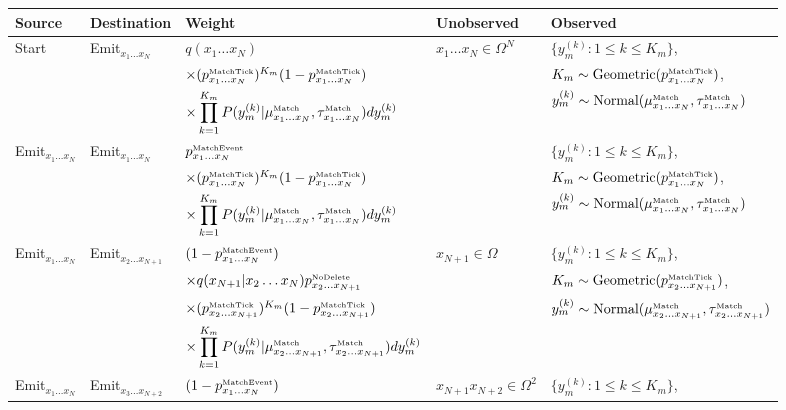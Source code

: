 \documentclass[10pt]{article}
\begin{document}
\noindent
\begin{tabular}{lllll}
\hline
Source & Destination & Weight & Unobserved & Observed \\
\hline
Start & Emit${}_{x_1 \ldots x_N}$ & $q(x_1 \ldots x_N)$ & $x_1 \ldots x_N \in \Omega^N$ & $\{ y_m^{(k)}: 1 \leq k \leq K_m \}$, \\
& & $\times (p^{\mbox{\tiny MatchTick}}_{x_1\ldots x_N})^{K_m} (1-p^{\mbox{\tiny MatchTick}}_{x_1\ldots x_N})$ & & $K_m \sim \mbox{Geometric}(p^{\mbox{\tiny MatchTick}}_{x_1\ldots x_N})$, \\
& & $\times \displaystyle \prod_{k=1}^{K_m} P(y^{(k)}_m|\mu^{\mbox{\tiny Match}}_{x_1\ldots x_N},\tau^{\mbox{\tiny Match}}_{x_1\ldots x_N}) dy^{(k)}_m$ & & $y_m^{(k)} \sim \mbox{Normal}(\mu^{\mbox{\tiny Match}}_{x_1\ldots x_N},\tau^{\mbox{\tiny Match}}_{x_1\ldots x_N})$ \\
Emit${}_{x_1 \ldots x_N}$ & Emit${}_{x_1 \ldots x_N}$ & ${p^{\mbox{\tiny MatchEvent}}_{x_1\ldots x_N}}$ & & $\{ y_m^{(k)}: 1 \leq k \leq K_m \}$, \\
& & $\times (p^{\mbox{\tiny MatchTick}}_{x_1\ldots x_N})^{K_m} (1-p^{\mbox{\tiny MatchTick}}_{x_1\ldots x_N} )$ & & $K_m \sim \mbox{Geometric}(p^{\mbox{\tiny MatchTick}}_{x_1\ldots x_N})$, \\
& & $\times \displaystyle \prod_{k=1}^{K_m} P(y^{(k)}_m|\mu^{\mbox{\tiny Match}}_{x_1\ldots x_N},\tau^{\mbox{\tiny Match}}_{x_1\ldots x_N}) dy^{(k)}_m$ & & $y_m^{(k)} \sim \mbox{Normal}(\mu^{\mbox{\tiny Match}}_{x_1\ldots x_N},\tau^{\mbox{\tiny Match}}_{x_1\ldots x_N})$ \\
Emit${}_{x_1 \ldots x_N}$ & Emit${}_{x_2 \ldots x_{N+1}}$ & $(1 - {p^{\mbox{\tiny MatchEvent}}_{x_1\ldots x_N}})$ & $x_{N+1} \in \Omega$ & $\{ y_m^{(k)}: 1 \leq k \leq K_m \}$, \\
& & $\times q(x_{N+1}|x_2\ldots x_N) p^{\mbox{\tiny NoDelete}}_{x_2\ldots x_{N+1}}$ & & $K_m \sim \mbox{Geometric}(p^{\mbox{\tiny MatchTick}}_{x_2\ldots x_{N+1}})$, \\
& & $\times (p^{\mbox{\tiny MatchTick}}_{x_2\ldots x_{N+1}})^{K_m} (1-p^{\mbox{\tiny MatchTick}}_{x_2\ldots x_{N+1}})$ & & $y_m^{(k)} \sim \mbox{Normal}(\mu^{\mbox{\tiny Match}}_{x_2\ldots x_{N+1}},\tau^{\mbox{\tiny Match}}_{x_2\ldots x_{N+1}})$ \\
& & $\times \displaystyle \prod_{k=1}^{K_m} P(y^{(k)}_m|\mu^{\mbox{\tiny Match}}_{x_2\ldots x_{N+1}},\tau^{\mbox{\tiny Match}}_{x_2\ldots x_{N+1}}) dy^{(k)}_m$ \\
Emit${}_{x_1 \ldots x_N}$ & Emit${}_{x_3 \ldots x_{N+2}}$ & $(1 - {p^{\mbox{\tiny MatchEvent}}_{x_1\ldots x_N}})$ & $x_{N+1} x_{N+2} \in \Omega^2$ & $\{ y_m^{(k)}: 1 \leq k \leq K_m \}$, \\

\end{tabular}
\end{document}
